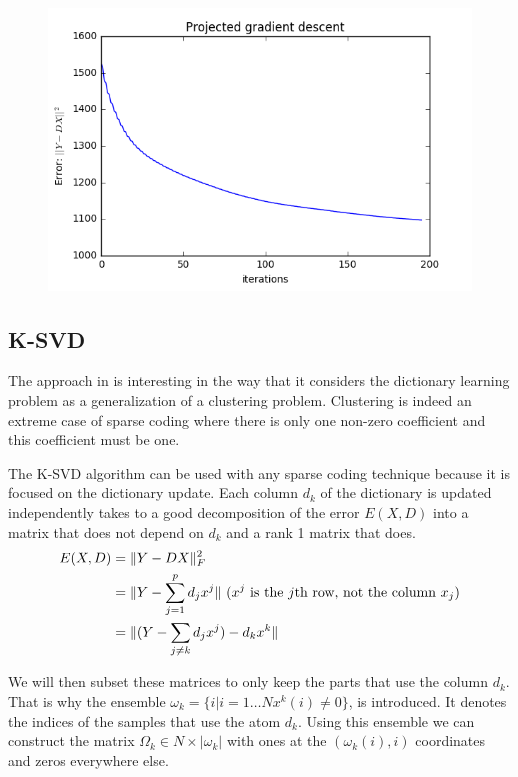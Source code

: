 \documentclass[a4paper,11pt]{article}
\DeclarePairedDelimiter\norm{\lVert}{\rVert} %
\begin{document}
\begin{figure}[!htbp]
\centering
  \includegraphics[width=\linewidth]{projected_gradient_descent.png}
\end{figure}

\subsection{K-SVD}
The approach in \cite{aharon06} is interesting in the way that it considers the dictionary learning problem as a generalization of a clustering problem. Clustering is indeed an extreme case of sparse coding where there is only one non-zero coefficient and this coefficient must be one.

The K-SVD algorithm can be used with any sparse coding technique because it is focused on the dictionary update.
Each column $d_k$ of the dictionary is updated independently takes to a good decomposition of the error $E(X,D)$ into a matrix that does not depend on $d_k$ and a rank 1 matrix that does.
\begin{equation} \label{eq:ksvd1}
\begin{split}
  E(X,D) & = \norm{Y - DX}_F^2 \\
  		 & = \norm{Y - \sum\limits_{j=1}^{p} d_j x^j} \text{ ($x^j$ is the $j$th row, not the column $x_j$)}\\
         & = \norm{(Y - \sum\limits_{j \neq k} d_j x^j)  - d_k x^k}
\end{split}
\end{equation}

We will then subset these matrices to only keep the parts that use the column $d_k$.
That is why the ensemble $\omega_k = \{i | i = 1 \ldots N x^k(i) \neq 0\}$, is introduced. It denotes the indices of the samples that use the atom $d_k$.
Using this ensemble we can construct the matrix $\Omega_k \in N \times |\omega_k|$ with ones at the $(\omega_k(i),i)$ coordinates and zeros everywhere else.
\end{document}
